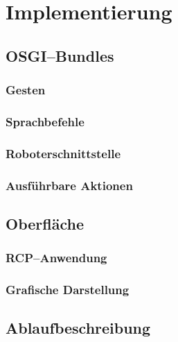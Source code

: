 \chapter{Implementierung}
\label{chap:Implementierung}

\section{OSGI--Bundles}
\subsection{Gesten}
\subsection{Sprachbefehle}
\subsection{Roboterschnittstelle}
\subsection{Ausf\"uhrbare Aktionen}

\section{Oberfl\"ache}
\subsection{RCP--Anwendung}
\subsection{Grafische Darstellung}

\section{Ablaufbeschreibung}
